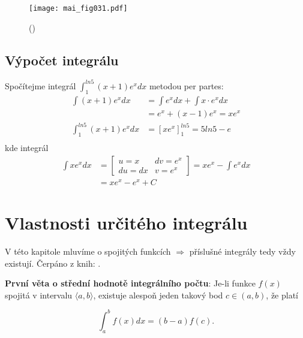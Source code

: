     \begin{figure}[ht!]  %
      \centering
      \texttt{[image: mai\_fig031.pdf]}
      \caption{
              (\cite[s.~10000]{Feynman01})}
      \label{mai:fig031}
    \end{figure}

  \subsection{Výpočet integrálu}
      \begin{example}
        Spočítejme integrál $\displaystyle \int_1^{ln5}{(x+1)e^xdx}$  metodou per partes: 
        \begin{align*}
          \int{(x+1)e^xdx} &= \int{e^xdx}+\int{x\cdot e^xdx}     \\
                           &= e^x + (x-1)e^x = xe^x              \\
          \int_1^{ln5}{(x+1)e^xdx} &= [xe^x]_1^{ln5} = 5ln5-e    \\
        \end{align*}
        kde integrál
        \begin{align*}
            \int{xe^xdx}
              &=\left[\begin{array}{cc}
                  u=x   & dv=e^x \\ [-1em]
                  du=dx & v=e^x
                \end{array}\right]= xe^x-\int{e^xdx}  \\
              &= xe^x - e^x+C
        \end{align*}
      \end{example}

\section{Vlastnosti určitého integrálu}
  V této kapitole mluvíme o spojitých funkcích $\Rightarrow$ příslušné integrály tedy vždy
  existují. Čerpáno z knih:
  \cite{Knichal}.

  \begin{lemma}
    \textbf{První věta o střední hodnotě integrálního počtu}: Je-li funkce $f(x)$ spojitá v
    intervalu $\langle a, b\rangle$, existuje alespoň jeden takový bod $c\in(a, b)$, že platí

    \begin{equation}\label{MA:eq_av1}
      \int_a^b f(x)dx = (b-a)f(c).
    \end{equation}
  \end{lemma}

